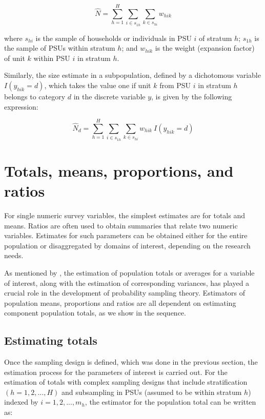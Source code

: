 \documentclass[
  12pt,
]{book}
\begin{document}
\[
\widehat{N} = \sum_{h=1}^{H} \sum_{i \in s_{1h}} \sum_{k \in s_{hi}} w_{hik}
\]

where \(s_{hi}\) is the sample of households or individuals in PSU \(i\) of stratum \(h\); \(s_{1h}\) is the sample of PSUs within stratum \(h\); and \(w_{hik}\) is the weight (expansion factor) of unit \(k\) within PSU \(i\) in stratum \(h\).

Similarly, the size estimate in a subpopulation, defined by a dichotomous variable \(I(y_{hik} = d)\), which takes the value one if unit \(k\) from PSU \(i\) in stratum \(h\) belongs to category \(d\) in the discrete variable \(y\), is given by the following expression:

\[
{\widehat{N}}_d = \sum_{h=1}^{H}\sum_{i \in s_{1h}} \sum_{ k \in s_{hi}} w_{hik} \ I(y_{hik} = d)
\]

\hypertarget{totals-means-proportions-and-ratios}{%
\section{Totals, means, proportions, and ratios}\label{totals-means-proportions-and-ratios}}

For single numeric survey variables, the simplest estimates are for totals and means. Ratios are often used to obtain summaries that relate two numeric variables. Estimates for such parameters can be obtained either for the entire population or disaggregated by domains of interest, depending on the research needs.

As mentioned by \citet{Heeringa_West_Berglund_2017}, the estimation of population totals or averages for a variable of interest, along with the estimation of corresponding variances, has played a crucial role in the development of probability sampling theory. Estimators of population means, proportions and ratios are all dependent on estimating component population totals, as we show in the sequence.

\hypertarget{estimating-totals}{%
\subsection{Estimating totals}\label{estimating-totals}}

Once the sampling design is defined, which was done in the previous section, the estimation process for the parameters of interest is carried out. For the estimation of totals with complex sampling designs that include stratification \(\left(h=1,2,...,H\right)\) and subsampling in PSUs (assumed to be within stratum \(h\)) indexed by \(i=1,2,...,m_h\), the estimator for the population total can be written as:
\end{document}
